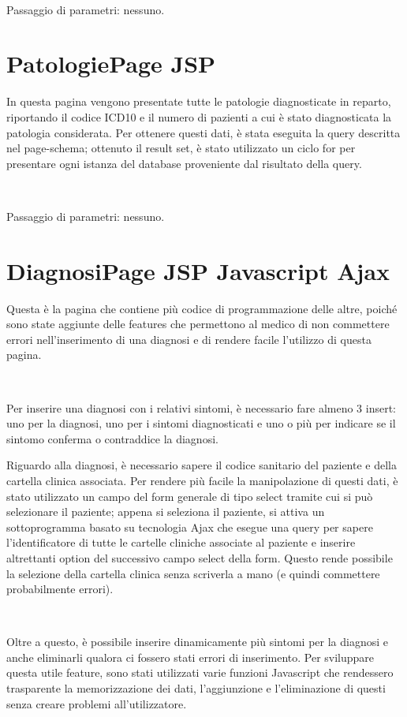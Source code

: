 \documentclass[a4paper,titlepage]{article}
\begin{document}
~

Passaggio di parametri: nessuno.


\section{PatologiePage JSP}

In questa pagina vengono presentate tutte le patologie diagnosticate in reparto, riportando il codice ICD10 e il numero di pazienti a cui è stato diagnosticata la patologia considerata. Per ottenere questi dati, è stata eseguita la query descritta nel page-schema; ottenuto il result set, è stato utilizzato un ciclo for per presentare ogni istanza del database proveniente dal risultato della query.

~

Passaggio di parametri: nessuno.


\section{DiagnosiPage JSP Javascript Ajax} 

Questa è la pagina che contiene più codice di programmazione delle altre, poiché sono state aggiunte delle features che permettono al medico di non commettere errori nell'inserimento di una diagnosi e di rendere facile l'utilizzo di questa pagina.

~

Per inserire una diagnosi con i relativi sintomi, è necessario fare almeno 3 insert: uno per la diagnosi, uno per i sintomi diagnosticati e uno o più per indicare se il sintomo conferma o contraddice la diagnosi.

Riguardo alla diagnosi, è necessario sapere il codice sanitario del paziente e della cartella clinica associata.
Per rendere più facile la manipolazione di questi dati, è stato utilizzato un campo del form generale di tipo select tramite cui si può selezionare il paziente; appena si seleziona il paziente, si attiva un sottoprogramma basato su tecnologia Ajax che esegue una query per sapere l'identificatore di tutte le cartelle cliniche associate al paziente e inserire altrettanti option del successivo campo select della form. Questo rende possibile la selezione della cartella clinica senza scriverla a mano (e quindi commettere probabilmente errori).

~

Oltre a questo, è possibile inserire dinamicamente più sintomi per la diagnosi e anche eliminarli qualora ci fossero stati errori di inserimento. Per sviluppare questa utile feature, sono stati utilizzati varie funzioni Javascript che rendessero trasparente la memorizzazione dei dati, l'aggiunzione e l'eliminazione di questi senza creare problemi all'utilizzatore. 
\end{document}
